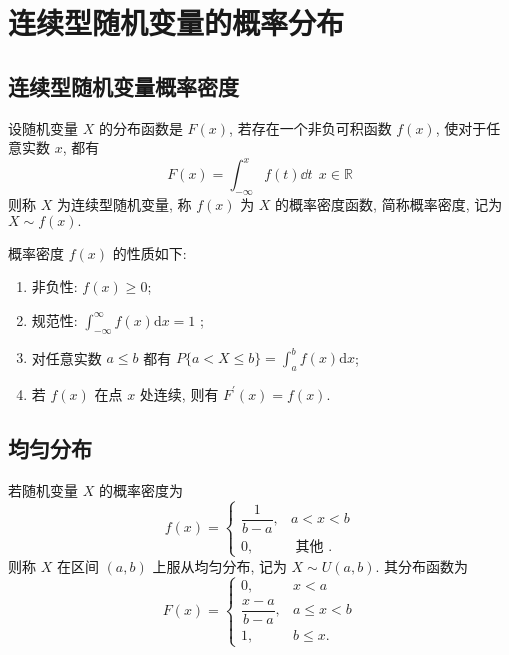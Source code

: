 \section{连续型随机变量的概率分布}

\subsection{连续型随机变量概率密度}

\begin{definition}[连续型随机变量概率密度]
    设随机变量 $ X $ 的分布函数是 $ F(x) $, 若存在一个非负可积函数 $ f(x) $, 使对于任意实数 $ x $, 都有
    $$F(x)=\int_{-\infty}^{x} f(t) \dd t ~~x \in \mathbb{R}$$
    则称 $ X $ 为连续型随机变量, 称 $ f(x) $ 为 $ X $ 的概率密度函数, 简称概率密度, 记为 $ X \sim f(x) .$
\end{definition}

\begin{theorem}[连续型随机变量概率密度的性质]
    概率密度 $ f(x) $ 的性质如下:
    \begin{enumerate}[label=(\arabic{*})]
        \item 非负性: $ f(x) \geqslant 0 $;
        \item 规范性: $ \displaystyle\int_{-\infty}^{\infty} f(x) \mathrm{d} x=1$ ;
        \item 对任意实数 $ a \leqslant b$ 都有 $\displaystyle P\{a<X \leqslant b\}=\int_{a}^{b} f(x) \mathrm{d} x $;
        \item 若 $ f(x) $ 在点 $ x $ 处连续, 则有 $ F^{\prime}(x)=f(x) .$
    \end{enumerate}
\end{theorem}

\subsection{均匀分布}

\begin{definition}[均匀分布]
    若随机变量 $ X $ 的概率密度为
    $$f(x)=\begin{cases}
            \dfrac{1}{b-a}, & a<x<b           \\[6pt]
            0,              & \text { 其他 .}
        \end{cases}$$
    则称 $ X $ 在区间 $ (a, b)$ 上服从均匀分布, 记为 $ X \sim U(a, b) $.
    其分布函数为
    $$F(x)=\begin{cases}
            0,                & x<a             \\
            \dfrac{x-a}{b-a}, & a \leqslant x<b \\[6pt]
            1,                & b \leqslant x.
        \end{cases}$$
\end{definition}

